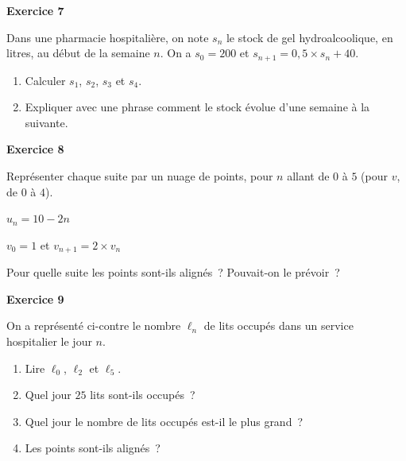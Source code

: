 \documentclass[a4paper,11pt]{article}
\newenvironment{exercice}[1]{%
  \Needspace{6\baselineskip}\par\bigskip\noindent\textbf{Exercice #1}\par\smallskip\noindent\ignorespaces
}{%
  \par
}
\newcommand{\grille}[4]{%
  \draw[very thin, gray!40, xstep=1, ystep=#4] (0,0) grid (#1,#2);
  \draw[->] (0,0) -- ({#1+0.5},0) node[right] {\small $n$};
  \draw[->] (0,0) -- (0,#2) -- ++(0,0.4cm);
  \foreach \x in {1,...,#1} \node[below] at (\x,0) {\scriptsize $\x$};
  \foreach \y in {#3} \node[left] at (0,\y) {\scriptsize $\y$};
  \node[below left] at (0,0) {\scriptsize $0$};
}
\begin{document}
\begin{exercice}{7}
Dans une pharmacie hospitalière, on note $s_n$ le stock de gel hydroalcoolique, en litres, au début de la semaine $n$. On a $s_0 = 200$ et $s_{n+1} = 0{,}5 \times s_n + 40$.
\begin{enumerate}[label=\arabic*.]
\item Calculer $s_1$, $s_2$, $s_3$ et $s_4$.
\item Expliquer avec une phrase comment le stock évolue d'une semaine à la suivante.
\end{enumerate}
\end{exercice}

\begin{exercice}{8}
Représenter chaque suite par un nuage de points, pour $n$ allant de $0$ à $5$ (pour $v$, de $0$ à $4$).

\medskip
\noindent
\begin{minipage}[t]{0.48\linewidth}
\centering
$u_n = 10 - 2n$

\smallskip
{}
\end{minipage}
\hfill
\begin{minipage}[t]{0.48\linewidth}
\centering
$v_0 = 1$ et $v_{n+1} = 2 \times v_n$

\smallskip
{}
\end{minipage}

\medskip
Pour quelle suite les points sont-ils alignés~? Pouvait-on le prévoir~?
\end{exercice}

\begin{exercice}{9}
\begin{minipage}[c]{0.5\linewidth}
On a représenté ci-contre le nombre $\ell_n$ de lits occupés dans un service hospitalier le jour $n$.
\begin{enumerate}[label=\arabic*.]
\item Lire $\ell_0$, $\ell_2$ et $\ell_5$.
\item Quel jour $25$ lits sont-ils occupés~?
\item Quel jour le nombre de lits occupés est-il le plus grand~?
\item Les points sont-ils alignés~?
\end{enumerate}
\end{minipage}
\hfill
\begin{minipage}[c]{0.46\linewidth}
\centering
{}
\end{minipage}
\end{exercice}
\end{document}
